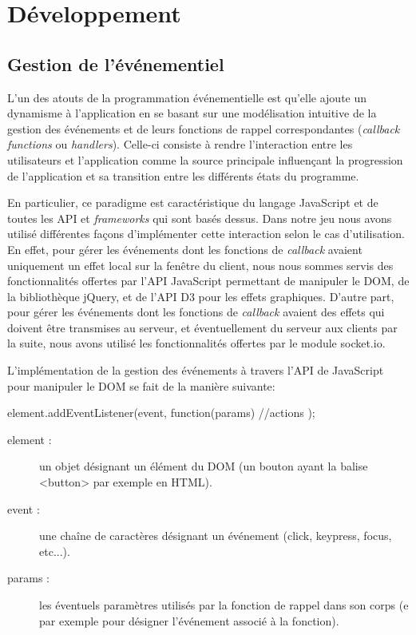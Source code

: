 \documentclass[12pt]{report}
\begin{document}
\chapter{Développement}

  \section{Gestion de l'événementiel}
	L'un des atouts de la programmation événementielle est qu'elle ajoute un dynamisme à l'application en se basant sur une modélisation intuitive de la gestion des événements et de leurs fonctions de rappel correspondantes (\textit{callback functions} ou \textit{handlers}). Celle-ci consiste à rendre l'interaction entre les utilisateurs et l'application comme la source principale influençant la progression de l'application et sa transition entre les différents états du programme.

	En particulier, ce paradigme est caractéristique du langage JavaScript et de toutes les API et \textit{frameworks} qui sont basés dessus. Dans notre jeu nous avons utilisé différentes façons d'implémenter cette interaction selon le cas d'utilisation. En effet, pour gérer les événements dont les fonctions de \textit{callback} avaient uniquement un effet local sur la fenêtre du client, nous nous sommes servis des fonctionnalités offertes par l'API JavaScript permettant de manipuler le DOM, de la bibliothèque jQuery, et de l'API D3 pour les effets graphiques. D'autre part, pour gérer les événements dont les fonctions de \textit{callback} avaient des effets qui doivent être transmises au serveur, et éventuellement du serveur aux clients par la suite, nous avons utilisé les fonctionnalités offertes par le module socket.io.

	L'implémentation de la gestion des événements à travers l'API de JavaScript pour manipuler le DOM se fait de la manière suivante:

	\begin{verbatimtab}[4]
		element.addEventListener(event, function(params){
			//actions
		});
	\end{verbatimtab}

	\begin{description}
		\item[element :]{
			un objet désignant un élément du DOM
			(un bouton ayant la balise <button> par exemple en HTML).
		}
		\item[event :]{
			une chaîne de caractères désignant un événement
			(click, keypress, focus, etc...).
		}
		\item[params :]{
			les éventuels paramètres utilisés par la fonction de rappel dans son corps
			(e par exemple pour désigner l'événement associé à la fonction).
		}
	\end{description}
\end{document}
